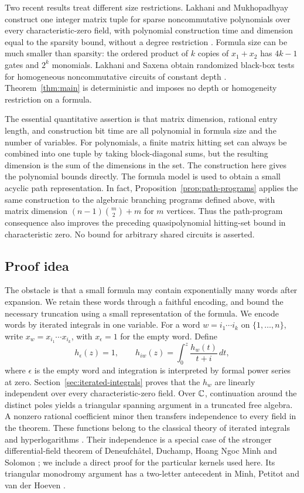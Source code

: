 Two recent results treat different size restrictions. Lakhani and Mukhopadhyay
construct one integer matrix tuple for sparse noncommutative polynomials
over every characteristic-zero field, with polynomial construction time
and dimension equal to the sparsity bound, without a degree restriction
\cite[Theorem~2.1 and Remark~2.6]{LakhaniMukhopadhyay2026}.
Formula size can be much smaller than sparsity:
the ordered product of $k$ copies of $x_1+x_2$ has $4k-1$ gates and $2^k$
monomials. Lakhani and Saxena obtain randomized black-box tests for homogeneous
noncommutative circuits of constant depth
\cite[Theorem~1]{LakhaniSaxena2026}. Theorem~\ref{thm:main} is deterministic
and imposes no depth or homogeneity restriction on a formula.

The essential quantitative assertion is that matrix dimension, rational entry
length, and construction bit time are all polynomial in formula size and
the number of variables. For polynomials, a finite matrix hitting set can
always be combined into one tuple by taking block-diagonal sums, but the
resulting dimension is the sum of the dimensions in the set.
The construction here gives the polynomial
bounds directly. The formula model is used to obtain a small acyclic path
representation. In fact, Proposition~\ref{prop:path-programs} applies the
same construction to the algebraic branching programs defined above,
with matrix dimension $(n-1)\binom m2+m$ for $m$ vertices.
Thus the path-program consequence also improves the preceding
quasipolynomial hitting-set bound in characteristic zero.
No bound for arbitrary shared circuits is asserted.

\subsection{Proof idea}

The obstacle is that a small formula may contain exponentially many words
after expansion. We retain these words through a faithful encoding, and
bound the necessary truncation using a small representation of the formula.
We encode words by iterated integrals in one variable. For a word $w=i_1\cdots i_k$ on
$\{1,\ldots,n\}$, write $x_w=x_{i_1}\cdots x_{i_k}$, with
$x_\epsilon=1$ for the empty word. Define
\[
 h_{\epsilon}(z)=1,
 \qquad
 h_{iw}(z)=\int_0^z\frac{h_w(t)}{t+i}\,dt,
\]
where $\epsilon$ is the empty word and integration is interpreted by formal
power series at zero. Section~\ref{sec:iterated-integrals} proves that the
$h_w$ are linearly independent over every characteristic-zero field. Over
$\mathbb{C}$, continuation around the distinct poles yields a triangular spanning
argument in a truncated free algebra. A nonzero rational coefficient minor
then transfers independence to every field in the theorem. These functions
belong to the classical theory of iterated integrals and hyperlogarithms
\cite{Chen1977}. Their independence is a special case of the stronger
differential-field theorem of Deneufch\^atel, Duchamp, Hoang Ngoc Minh and
Solomon \cite[Theorem~1]{DeneufchatelEtAl2011}; we include a direct proof
for the particular kernels used here. Its triangular monodromy argument
has a two-letter antecedent in Minh, Petitot and van der Hoeven
\cite[Section~5, Theorem~4]{MinhPetitotVanderHoeven1998}.

